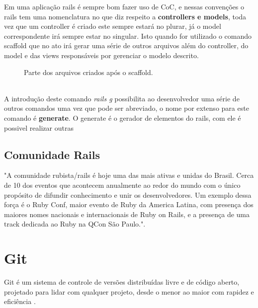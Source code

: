Em uma aplicação rails é sempre bom fazer uso de CoC, e nessas convenções o rails tem uma nomenclatura no que diz respeito a \textbf{controllers e models}, toda vez que um controller é criado
este sempre estará no plurar, já o model correspondente irá sempre estar no singular. Isto quando for utilizado o comando scaffold que no ato irá gerar uma série de outros arquivos além do controller, 
do model e das views responsáveis por gerenciar o modelo descrito.
\\
\begin{figure}[ht]
    \centering
    \caption{Parte dos arquivos criados após o scaffold.}
    \label{submeter}
\end{figure}
\\
A introdução deste comando \textit{rails g} possibilita ao desenvolvedor uma série de outros comandos
uma vez que pode ser abreviado, o nome por extenso para este comando é \textbf{generate}. O generate é o gerador de elementos do rails, com ele é possivel realizar outras 

\subsection{Comunidade Rails}

"A comunidade rubista/rails é hoje uma das mais ativas e unidas do Brasil. Cerca de 10 dos eventos que acontecem anualmente
ao redor do mundo com o único propósito de difundir conhecimento e unir os desenvolvedores. Um exemplo dessa força é o Ruby Conf, maior evento 
de Ruby da America Latina, com presença dos maiores nomes nacionais e internacionais de Ruby on Rails, e a presença de uma track dedicada ao 
Ruby na QCon São Paulo."\cite{CAELUM}.

\section{Git}
Git é um sistema de controle de versões distribuídas livre e de código aberto, projetado para lidar com qualquer projeto, desde o menor ao maior com rapidez e eficiência \cite{SOFTWARE-FREEDOM-CONSERVANCY}.

